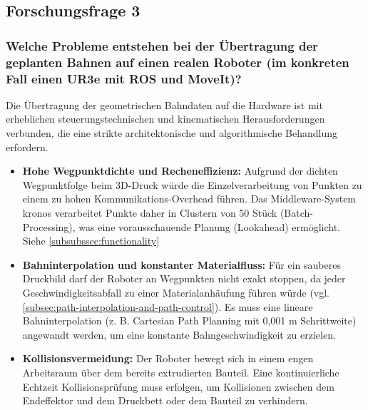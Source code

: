     \subsection{Forschungsfrage 3}
      \subsubsection{Welche Probleme entstehen bei der Übertragung der geplanten Bahnen auf einen realen Roboter (im konkreten Fall einen UR3e mit ROS und MoveIt)?}
        Die Übertragung der geometrischen Bahndaten auf die Hardware ist mit erheblichen steuerungstechnischen und kinematischen Herausforderungen verbunden, die eine strikte architektonische und algorithmische Behandlung erfordern.
        \begin{itemize}
        \item \textbf{Hohe Wegpunktdichte und Recheneffizienz:} Aufgrund der dichten Wegpunktfolge beim 3D-Druck würde die Einzelverarbeitung von Punkten zu einem zu hohen Kommunikations-Overhead führen.
        Das Middleware-System \ac{kronos} verarbeitet Punkte daher in Clustern von 50 Stück (Batch-Processing), was eine vorausschauende Planung (Lookahead) ermöglicht.
        Siehe \ref{subsubssec:functionality}
        \item \textbf{Bahninterpolation und konstanter Materialfluss:} Für ein sauberes Druckbild darf der Roboter an Wegpunkten nicht exakt stoppen, da jeder Geschwindigkeitsabfall zu einer Materialanhäufung führen würde (vgl. \ref{subsec:path-interpolation-and-path-control}).
        Es muss eine lineare Bahninterpolation (z. B. Cartesian Path Planning mit 0,001 m Schrittweite) angewandt werden, um eine konstante Bahngeschwindigkeit zu erzielen.
        \item \textbf{Kollisionsvermeidung:} Der Roboter bewegt sich in einem engen Arbeitsraum über dem bereits extrudierten Bauteil.
        Eine kontinuierliche Echtzeit Kollisionsprüfung muss erfolgen, um Kollisionen zwischen dem Endeffektor und dem Druckbett oder dem Bauteil zu verhindern.
        \end{itemize}

